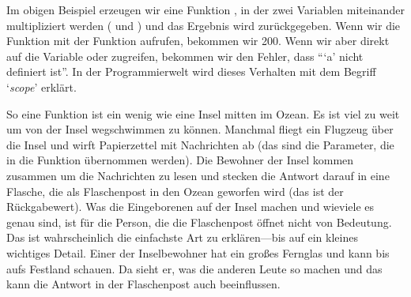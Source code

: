 Im obigen Beispiel erzeugen wir eine Funktion , in der zwei Variablen miteinander multipliziert werden ( und ) und das Ergebnis wird zurückgegeben. Wenn wir die Funktion mit der  Funktion aufrufen, bekommen wir 200. Wenn wir aber direkt auf die Variable  oder  zugreifen, bekommen wir den Fehler, dass ```a' nicht definiert ist''. In der Programmierwelt wird dieses Verhalten mit dem Begriff `\emph{scope}' erklärt. 
\par
So eine Funktion ist ein wenig wie eine Insel mitten im Ozean. Es ist viel zu weit um von der Insel wegschwimmen zu können. Manchmal fliegt ein Flugzeug über die Insel und wirft Papierzettel mit Nachrichten ab (das sind die Parameter, die in die Funktion übernommen werden). Die Bewohner der Insel kommen zusammen um die Nachrichten zu lesen und stecken die Antwort darauf in eine Flasche, die als Flaschenpost in den Ozean geworfen wird (das ist der Rückgabewert). Was die Eingeborenen auf der Insel machen und wieviele es genau sind, ist für die Person, die die Flaschenpost öffnet nicht von Bedeutung. Das ist wahrscheinlich die einfachste Art  zu erklären---bis auf ein kleines wichtiges Detail. Einer der Inselbewohner hat ein großes Fernglas und kann bis aufs Festland schauen. Da sieht er, was die anderen Leute so machen und das kann die Antwort in der Flaschenpost auch beeinflussen.

